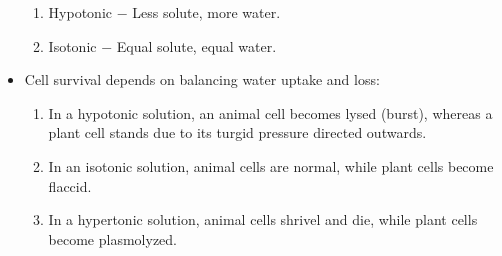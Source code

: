 \documentclass[12pt]{article}
\begin{document}
\begin{itemize}
\begin{enumerate}
      \item Hypotonic $-$ Less solute,  more water.

      \item Isotonic $-$ Equal solute, equal water.

    \end{enumerate}

  \item Cell survival depends on balancing water uptake and loss:

    \begin{enumerate}

      \item In a hypotonic solution, an animal cell becomes lysed (burst), whereas a plant cell stands due to its turgid pressure directed outwards.

      \item In an isotonic solution, animal cells are normal, while plant cells become flaccid.

      \item In a hypertonic solution, animal cells shrivel and die, while plant cells become plasmolyzed.

    \end{enumerate}



\end{itemize}
\end{document}
